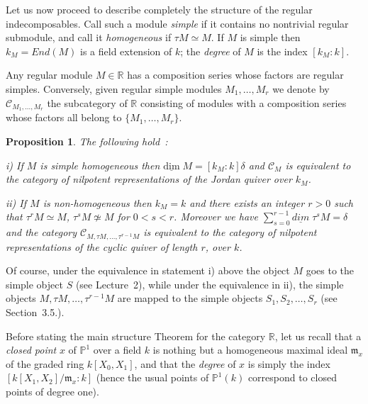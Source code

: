 \documentclass[a4paper,10pt]{amsart}
\newtheorem{prop}[theo]{Proposition}
\numberwithin{equation}{section}
\begin{document}
\vspace{.2in}

Let us now proceed to describe completely the structure of the regular indecomposables. Call such a module \textit{simple} if it contains no nontrivial regular submodule, and call it \textit{homogeneous} if $\tau M \simeq M$. If $M$ is simple then $k_M={End}(M)$ is a field extension of $k$; the \textit{degree} of $M$ is the index $[k_M:k]$.

Any regular module $M \in \mathbb{R}$ has a composition series whose factors are regular simples. Conversely, given regular simple modules $M_1, \ldots, M_r$ we denote by $\mathcal{C}_{M_1, \ldots, M_r}$ the subcategory of $\mathbb{R}$ consisting of modules with a composition series whose factors all belong to $\{M_1, \ldots, M_r\}$.

\vspace{.15in}

\begin{prop}\label{P:noname1} The following hold~:

\vspace{.05in}

\noindent
i) If $M$ is simple homogeneous then $\underline{\text{dim}}\;M=[k_M:k]\delta$ and $\mathcal{C}_M$ is equivalent to the category of nilpotent representations of the Jordan quiver over $k_M$.

\vspace{.05in}

\noindent
ii) If $M$ is non-homogeneous then $k_M=k$ and there exists an integer $r>0$ such that $\tau^r M\simeq M$, $\tau^s M \not\simeq M$ for $0<s<r$. Moreover we have $\sum_{s=0}^{r-1} \underline{{dim}}\;\tau^sM=\delta$ and the category $\mathcal{C}_{M,\tau M, \ldots, \tau^{r-1}M}$ is equivalent to the category of nilpotent representations of the cyclic quiver of length $r$, over $k$.
\end{prop}

\vspace{.15in}

Of course, under the equivalence in statement i) above the object $M$ goes to the simple object $S$ (see Lecture~2), while under the equivalence in ii), the simple objects $M, \tau M, \ldots, \tau^{r-1} M$ are mapped to the simple objects $S_1, S_2, \ldots, S_r$ (see Section~3.5.).
\vspace{.15in}

Before stating the main structure Theorem for the category $\mathbb{R}$, let us recall that a \textit{closed
point} $x$ of $\mathbb{P}^1$ over a field $k$ is nothing but a homogeneous maximal ideal $\mathfrak{m}_x$ of the graded ring $k[X_0,X_1]$, and that the \textit{degree} of $x$ is simply the index $[k[X_1,X_2]/\mathfrak{m}_x:k]$ (hence the usual points of $\mathbb{P}^1(k)$ correspond to closed points of degree one).
\end{document}
